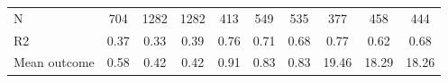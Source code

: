 \begin{tabular}{lccc|ccc|ccc}
N           &         704         &        1282         &        1282         &         413         &         549         &         535         &         377         &         458         &         444         \\
R2          &        0.37         &        0.33         &        0.39         &        0.76         &        0.71         &        0.68         &        0.77         &        0.62         &        0.68         \\
Mean outcome&        0.58         &        0.42         &        0.42         &        0.91         &        0.83         &        0.83         &       19.46         &       18.29         &       18.26         \\
\bottomrule \end{tabular}
